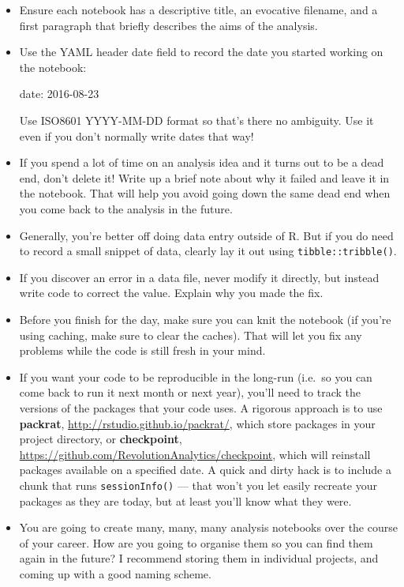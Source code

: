 \documentclass[]{book}
\newenvironment{Shaded}{\begin{snugshade}}{\end{snugshade}}
\newcommand{\FunctionTok}[1]{\textcolor[rgb]{0.00,0.00,0.00}{{#1}}}
\newcommand{\NormalTok}[1]{{#1}}
\begin{document}
\begin{itemize}
\item
  Ensure each notebook has a descriptive title, an evocative filename,
  and a first paragraph that briefly describes the aims of the analysis.
\item
  Use the YAML header date field to record the date you started working
  on the notebook:

\begin{Shaded}
\begin{Highlighting}[]
\FunctionTok{date:} \NormalTok{2016-08-23}
\end{Highlighting}
\end{Shaded}

  Use ISO8601 YYYY-MM-DD format so that's there no ambiguity. Use it
  even if you don't normally write dates that way!
\item
  If you spend a lot of time on an analysis idea and it turns out to be
  a dead end, don't delete it! Write up a brief note about why it failed
  and leave it in the notebook. That will help you avoid going down the
  same dead end when you come back to the analysis in the future.
\item
  Generally, you're better off doing data entry outside of R. But if you
  do need to record a small snippet of data, clearly lay it out using
  \texttt{tibble::tribble()}.
\item
  If you discover an error in a data file, never modify it directly, but
  instead write code to correct the value. Explain why you made the fix.
\item
  Before you finish for the day, make sure you can knit the notebook (if
  you're using caching, make sure to clear the caches). That will let
  you fix any problems while the code is still fresh in your mind.
\item
  If you want your code to be reproducible in the long-run (i.e.~so you
  can come back to run it next month or next year), you'll need to track
  the versions of the packages that your code uses. A rigorous approach
  is to use \textbf{packrat}, \url{http://rstudio.github.io/packrat/},
  which store packages in your project directory, or
  \textbf{checkpoint},
  \url{https://github.com/RevolutionAnalytics/checkpoint}, which will
  reinstall packages available on a specified date. A quick and dirty
  hack is to include a chunk that runs \texttt{sessionInfo()} --- that
  won't you let easily recreate your packages as they are today, but at
  least you'll know what they were.
\item
  You are going to create many, many, many analysis notebooks over the
  course of your career. How are you going to organise them so you can
  find them again in the future? I recommend storing them in individual
  projects, and coming up with a good naming scheme.
\end{itemize}
\end{document}
